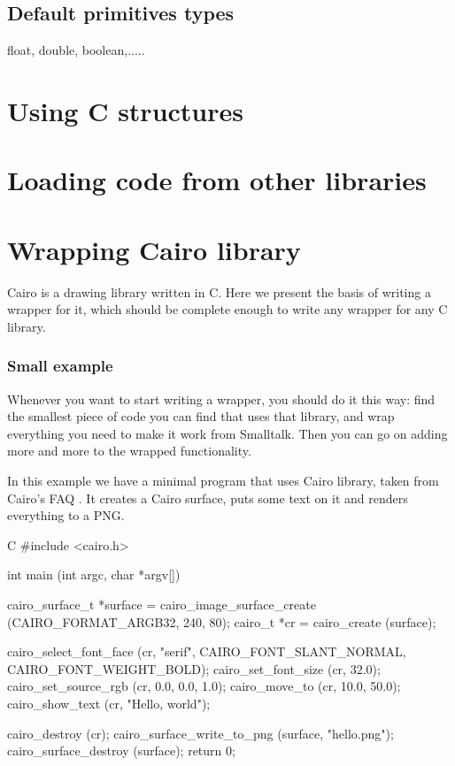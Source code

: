\documentclass[a4paper,10pt,twoside]{book}
\begin{document}
\subsection{Default primitives types}

float, double, boolean,.....


\section{Using C structures}

\section{Loading code from other libraries}


\section{Wrapping Cairo library}

Cairo is a drawing library written in C. Here we present
the basis of writing a wrapper for it, which should be
complete enough to write any wrapper for any C library.

\subsubsection*{Small example}

Whenever you want to start writing a wrapper, you should do
it this way: find the smallest piece of code you can find 
that uses that library, and wrap everything you need to make
it work from Smalltalk. Then you can go on adding more and
more to the wrapped functionality. 

In this example we have a minimal program that uses Cairo
library, taken from Cairo's FAQ .
It creates a Cairo surface, puts some text on it
and renders everything to a PNG.

\begin{code}{C}
#include <cairo.h>

int
main (int argc, char *argv[])
{
        cairo_surface_t *surface =
            cairo_image_surface_create (CAIRO_FORMAT_ARGB32, 240, 80);
        cairo_t *cr =
            cairo_create (surface);

        cairo_select_font_face (cr, "serif", CAIRO_FONT_SLANT_NORMAL, CAIRO_FONT_WEIGHT_BOLD);
        cairo_set_font_size (cr, 32.0);
        cairo_set_source_rgb (cr, 0.0, 0.0, 1.0);
        cairo_move_to (cr, 10.0, 50.0);
        cairo_show_text (cr, "Hello, world");

        cairo_destroy (cr);
        cairo_surface_write_to_png (surface, "hello.png");
        cairo_surface_destroy (surface);
        return 0;
}
\end{code}
\end{document}
